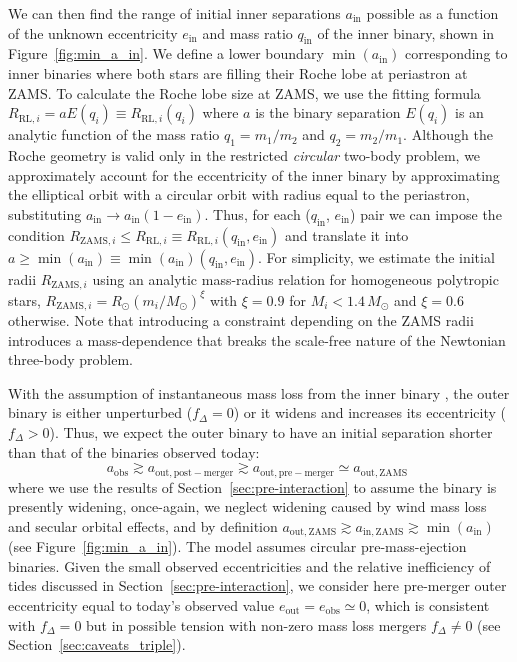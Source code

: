 \documentclass{aa}
\DeclareRobustCommand{\Figref}[1]{Figure~\ref{#1}}
\DeclareRobustCommand{\Secref}[1]{Section~\ref{#1}}
\begin{document}
We can then find the range of initial inner separations
$a_\mathrm{in}$ possible as a function of the unknown eccentricity
$e_\mathrm{in}$ and mass ratio $q_\mathrm{in}$ of the inner binary,
shown in \Figref{fig:min_a_in}. We define a lower boundary
$\min(a_\mathrm{in})$ corresponding to inner binaries where both stars
are filling their Roche lobe at periastron at ZAMS. To calculate the
Roche lobe size at ZAMS, we use the \cite{eggleton:83} fitting formula
$R_{\mathrm{RL},i} = a E(q_i) \equiv R_{\mathrm{RL},i}(q_i)$ where $a$
is the binary separation $E(q_i)$ is an analytic function of the mass
ratio $q_1=m_1/m_2$ and $q_2=m_2/m_1$. Although the Roche geometry is
valid only in the restricted \emph{circular} two-body problem, we approximately
account for the eccentricity of the inner binary by approximating the
elliptical orbit with a circular orbit with radius equal to the
periastron, substituting
$a_\mathrm{in}\rightarrow a_\mathrm{in}(1-e_\mathrm{in})$. Thus, for
each ($q_\mathrm{in}$, $e_\mathrm{in}$) pair we can impose the condition
$R_{\mathrm{ZAMS},i} \leq R_{\mathrm{RL}, i}\equiv R_{\mathrm{RL}, i}(q_\mathrm{in}, e_\mathrm{in})$
and translate
it into
$a\geq \min(a_\mathrm{in}) \equiv \min(a_\mathrm{in})(q_\mathrm{in},e_\mathrm{in})$.
For simplicity, we estimate the initial radii $R_{\mathrm{ZAMS}, i}$
using an analytic mass-radius relation for homogeneous polytropic
stars, $R_{\mathrm{ZAMS} ,i}= R_\odot(m_i/M_\odot)^{\xi}$ with
$\xi=0.9$ for $M_i<1.4\,M_\odot$ and $\xi=0.6$ otherwise. Note that
introducing a constraint depending on the ZAMS radii introduces a
mass-dependence that breaks the scale-free nature of the Newtonian
three-body problem.

With the assumption of instantaneous mass loss from the inner binary
\citep{blaauw:61}, the outer binary is either unperturbed
($f_\Delta=0$) or it widens and increases its eccentricity
($f_\Delta>0$). Thus, we expect the outer binary to have an initial
separation shorter than that of the binaries observed today:
\begin{equation}
  \label{eq:sep_ordering}
  a_\mathrm{obs} \gtrsim a_\mathrm{out,post-merger}\gtrsim
  a_\mathrm{out, pre-merger}\simeq a_\mathrm{out, ZAMS} \ \,
\end{equation}
where we use the results of \Secref{sec:pre-interaction} to assume the binary is presently widening, once-again, we neglect widening caused by wind mass loss and
secular orbital effects, and by definition
$a_\mathrm{out,ZAMS} \gtrsim a_\mathrm{in, ZAMS} \gtrsim \min(a_\mathrm{in})$
(see \Figref{fig:min_a_in}). The \cite{blaauw:61} model assumes
circular pre-mass-ejection binaries. Given the small observed
eccentricities and the relative inefficiency of tides discussed in
\Secref{sec:pre-interaction}, we consider here pre-merger outer
eccentricity equal to today's observed value
$e_\mathrm{out}=e_\mathrm{obs}\simeq0$, which is consistent with
$f_\Delta=0$ but in possible tension with non-zero mass loss mergers
$f_\Delta\neq0$ (see \Secref{sec:caveats_triple}).
\end{document}
